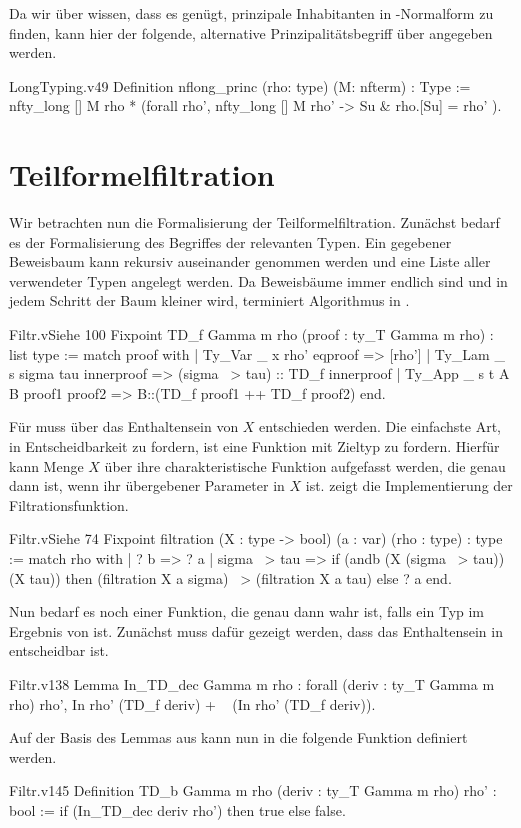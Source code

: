 Da wir über  wissen, dass es genügt, prinzipale Inhabitanten in \teta-Normalform zu finden, kann hier der folgende, alternative Prinzipalitätsbegriff über  angegeben werden.
\begin{code}{LongTyping.v}{}{49}
Definition nflong_princ (rho: type) (M: nfterm) : Type :=
    nfty_long [] M rho * (forall rho', 
      nfty_long [] M rho' -> 
        { Su & rho.[Su] = rho' }).
\end{code}
\section{Teilformelfiltration}
Wir betrachten nun die Formalisierung der Teilformelfiltration. Zunächst bedarf es der Formalisierung des Begriffes der relevanten Typen. Ein gegebener Beweisbaum  kann rekursiv auseinander genommen werden und eine Liste aller verwendeter Typen angelegt werden. Da Beweisbäume immer endlich sind und in jedem Schritt der Baum kleiner wird, terminiert Algorithmus in .
\begin{code}[TD_f]{Filtr.v}{Siehe }{100}
Fixpoint TD_f {Gamma m rho} (proof : ty_T Gamma m rho) : list type :=
  match proof with
  | Ty_Var _ x rho' eqproof => [rho']
  | Ty_Lam _ s sigma tau innerproof => 
      (sigma ~> tau) :: TD_f innerproof
  | Ty_App _ s t A B proof1 proof2 => 
      B::(TD_f proof1 ++ TD_f proof2)
  end.    
\end{code}

Für  muss über das Enthaltensein von $X$ entschieden werden. Die einfachste Art, in \coq{} Entscheidbarkeit zu fordern, ist eine Funktion mit Zieltyp  zu fordern. Hierfür kann Menge $X$ über ihre charakteristische Funktion aufgefasst werden, die genau dann  ist, wenn ihr übergebener Parameter in $X$ ist.  zeigt die Implementierung der Filtrationsfunktion.

\begin{code}[filtration]{Filtr.v}{Siehe }{74}
Fixpoint filtration 
    (X : type -> bool) (a : var) (rho : type) : type :=
  match rho with
  | ? b => ? a
  | sigma ~> tau => if (andb (X (sigma ~> tau)) (X tau)) then
    (filtration X a sigma) ~> (filtration X a tau)
      else
    ? a
  end.
\end{code}

Nun bedarf es noch einer Funktion, die genau dann wahr ist, falls ein Typ im Ergebnis von  ist. Zunächst muss dafür gezeigt werden, dass das Enthaltensein in  entscheidbar ist.
\begin{code}[In_TD_dec]{Filtr.v}{}{138}
Lemma In_TD_dec {Gamma m rho} : forall (deriv : ty_T Gamma m rho) rho', 
    {In rho' (TD_f deriv)} + { ~ (In rho' (TD_f deriv))}.
\end{code}
Auf der Basis des Lemmas aus  kann nun in  die folgende Funktion definiert werden.
\begin{code}[TD_b]{Filtr.v}{}{145}
Definition TD_b {Gamma m rho} (deriv : ty_T Gamma m rho) rho' : bool :=
    if (In_TD_dec deriv rho') then true else false.
\end{code}

